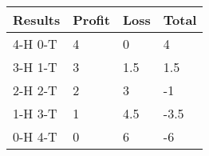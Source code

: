 \begin{tabular}{|l|l|l|l|}\hline
Results	&Profit	&Loss	&Total\\\hline
4-H  0-T	&4	&0	&4\\\hline
3-H  1-T	&3	&1.5	&1.5\\\hline
2-H  2-T	&2	&3	&-1\\\hline
1-H  3-T	&1	&4.5	&-3.5\\\hline
0-H  4-T	&0	&6	&-6\\\hline
\end{tabular}
